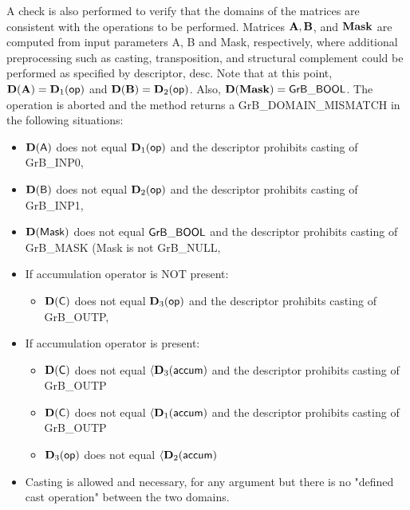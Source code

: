 {A check is also performed to verify that the domains of the matrices are consistent
with the operations to be performed.  Matrices ${\bf A}, {\bf B}$, and 
${\bf Mask}$ are computed from input parameters {\sf A}, {\sf B} and {\sf Mask},
respectively, where additional preprocessing such as casting, transposition, and
structural complement could be performed as specified by descriptor, {\sf desc}.
Note that at this point, $\bold{D}({\bf A}) = \bold{D}_1({\sf op})$ and 
$\bold{D}({\bf B}) = \bold{D}_2({\sf op})$.  Also, $\bold{D}({\bf Mask}) = 
{\sf GrB\_BOOL}$.  The operation is aborted and the method returns a {\sf GrB\_DOMAIN\_MISMATCH}
in the following situations:
\begin{itemize}
\item $\bold{D}({\sf A})$ does not equal $\bold{D}_1({\sf op})$ and the descriptor prohibits casting of {\sf GrB\_INP0},
\item $\bold{D}({\sf B})$ does not equal $\bold{D}_2({\sf op})$ and the descriptor prohibits casting of {\sf GrB\_INP1},
\item $\bold{D}({\sf Mask})$ does not equal ${\sf GrB\_BOOL}$ and the descriptor prohibits casting of {\sf GrB\_MASK} (Mask is not {\sf GrB\_NULL},
\item If accumulation operator is NOT present:
        \begin{itemize}
        \item $\bold{D}({\sf C})$ does not equal $\bold{D}_3({\sf op})$ and the descriptor prohibits casting of {\sf GrB\_OUTP},
        \end{itemize}
\item If accumulation operator is present:
        \begin{itemize}
        \item $\bold{D}({\sf C})$ does not equal $\langle \bold{D}_3({\sf accum})$ and the descriptor prohibits casting of {\sf GrB\_OUTP}
        \item $\bold{D}({\sf C})$ does not equal $\langle \bold{D}_1({\sf accum})$ and the descriptor prohibits casting of {\sf GrB\_OUTP}
        \item $\bold{D}_3({\sf op})$ does not equal $\langle \bold{D}_2({\sf accum})$
        \end{itemize}
\item Casting is allowed and necessary, for any argument but there is no "defined cast operation" between the two domains.
\end{itemize}



}
